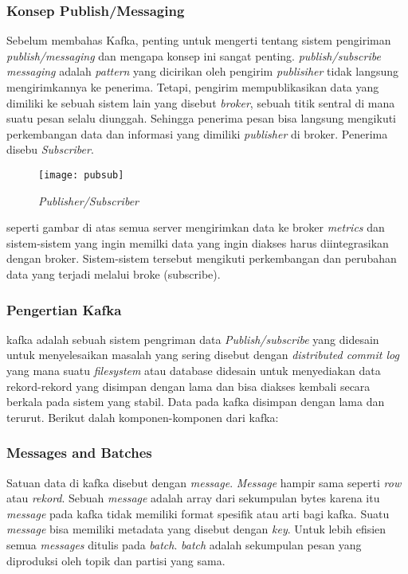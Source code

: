 \subsubsection{Konsep Publish/Messaging}
Sebelum membahas Kafka, penting untuk mengerti tentang sistem pengiriman \textit{publish/messaging} dan mengapa konsep ini sangat penting. \textit{publish/subscribe messaging} adalah \textit{pattern} yang dicirikan oleh pengirim \textit{publisiher} tidak langsung mengirimkannya ke penerima. Tetapi, pengirim mempublikasikan data yang dimiliki ke sebuah sistem lain yang disebut \textit{broker}, sebuah titik sentral di mana suatu pesan selalu diunggah. Sehingga penerima pesan bisa langsung mengikuti perkembangan data dan informasi yang dimiliki \textit{publisher} di broker. Penerima disebu \textit{Subscriber}.

\begin{figure}[H] 
	\centering  
	\texttt{[image: pubsub]}  
	\caption[Gambar Publisher/Subscriber]{\textit{Publisher/Subscriber}} 
	\label{fig:pub-sub} 
\end{figure}

seperti gambar di atas semua server mengirimkan data ke broker \textit{metrics} dan sistem-sistem yang ingin memilki data yang ingin diakses harus diintegrasikan dengan broker. Sistem-sistem tersebut mengikuti perkembangan dan perubahan data yang terjadi melalui broke (subscribe).

\subsubsection{Pengertian Kafka}
kafka adalah sebuah sistem pengriman data \textit{Publish/subscribe} yang didesain untuk menyelesaikan masalah yang sering disebut dengan \textit{distributed commit log} yang mana suatu \textit{filesystem} atau database didesain untuk menyediakan data rekord-rekord yang disimpan dengan lama dan bisa diakses kembali secara berkala pada sistem yang stabil. Data pada kafka disimpan dengan lama dan terurut. Berikut dalah komponen-komponen dari kafka:
 
\subsubsection{Messages and Batches} 
 Satuan data di kafka disebut dengan \textit{message}. \textit{Message} hampir sama seperti \textit{row} atau \textit{rekord}. Sebuah \textit{message} adalah array dari sekumpulan bytes karena itu \textit{message} pada kafka tidak memiliki format spesifik atau arti bagi kafka. Suatu \textit{message} bisa memiliki metadata yang disebut dengan \textit{key}. Untuk lebih efisien semua \textit{messages} ditulis pada \textit{batch}. \textit{batch} adalah sekumpulan pesan yang diproduksi oleh topik dan partisi yang sama. 
 

